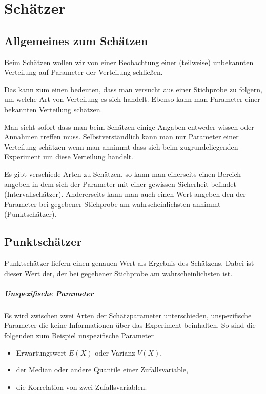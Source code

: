 \chapter{Schätzer}
\section{Allgemeines zum Schätzen}
Beim Schätzen wollen wir von einer Beobachtung einer (teilweise) unbekannten Verteilung auf Parameter der Verteilung schließen.

Das kann zum einen bedeuten, dass man versucht aus einer Stichprobe zu folgern, um welche Art von Verteilung es sich handelt. Ebenso kann man Parameter einer bekannten Verteilung schätzen.

Man sieht sofort dass man beim Schätzen einige Angaben entweder wissen oder Annahmen treffen muss.
Selbstverständlich kann man nur Parameter einer Verteilung schätzen wenn man annimmt dass sich beim zugrundeliegenden Experiment um diese Verteilung handelt.

Es gibt verschiede Arten zu Schätzen, so kann man einerseits einen Bereich angeben in dem sich der Parameter mit einer gewissen Sicherheit befindet (Intervallschätzer). Andererseits kann man auch einen Wert angeben den der Parameter bei gegebener Stichprobe am wahrscheinlichsten annimmt (Punktschätzer).











\section{Punktschätzer}
Punktschätzer liefern einen genauen Wert als Ergebnis des Schätzens. Dabei ist dieser Wert der, der bei gegebener Stichprobe am wahrscheinlichsten ist.



\paragraph{Unspezifische Parameter}
Es wird zwischen zwei Arten der Schätzparameter unterschieden, unspezifische Parameter die keine Informationen über das Experiment beinhalten. So sind die folgenden zum Beispiel unspezifische Parameter
\begin{itemize}
	\item Erwartungswert $E(X)$ oder Varianz $V(X)$,
	\item der Median oder andere Quantile einer Zufallsvariable,
	\item die Korrelation von zwei Zufallsvariablen.
\end{itemize}
